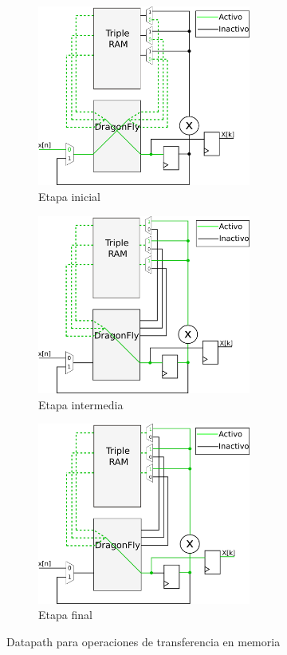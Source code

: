 \begin{figure}[htb!]
        \centering
        \begin{subfigure}{\columnwidth}\centering
        \includegraphics[width=7cm]{./figures/datapathR4_mem_ini.png}
        \caption{Etapa inicial}
        \end{subfigure}
        \begin{subfigure}{\columnwidth}\centering
        \includegraphics[width=7cm]{./figures/datapathR4_mem_int.png}
        \caption{Etapa intermedia}
        \end{subfigure}
        \begin{subfigure}{\columnwidth}\centering
        \includegraphics[width=7cm]{./figures/datapathR4_mem_fin.png}
        \caption{Etapa final}
        \end{subfigure}
        \caption{Datapath para operaciones de transferencia en memoria}
        \label{fig:datapathMemR4}
\end{figure}

